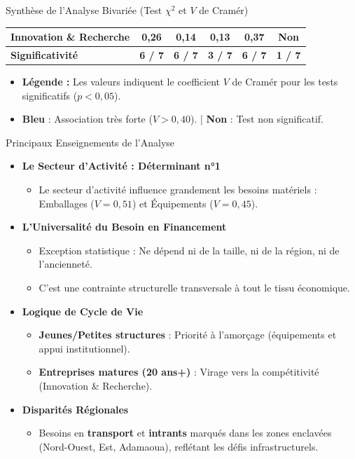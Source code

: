 \documentclass[aspectratio=169, 10pt]{beamer}
\begin{document}
\begin{frame}{Synthèse de l'Analyse Bivariée (Test $\chi^2$ et $V$ de Cramér)}
\begin{center}
\begin{tabular}{l|ccccc}
			Innovation \& Recherche & \cellcolor{green!15}0,26 & \cellcolor{green!15}0,14 & \cellcolor{green!10}0,13 & \cellcolor{green!15}0,37 & Non \\
			\midrule
			\textbf{Significativité} & \textbf{6 / 7} & \textbf{6 / 7} & \textbf{3 / 7} & \textbf{6 / 7} & \textbf{1 / 7} \\
			\bottomrule
		\end{tabular}
	\end{center}
	\vfill
	\begin{itemize}
		\item \tiny \textbf{Légende :} Les valeurs indiquent le coefficient $V$ de Cramér pour les tests significatifs ($p < 0,05$). 
		\item \tiny \color{blue!80}\textbf{Bleu} : Association très forte ($V > 0,40$). \color{black} | \color{gray}\textbf{Non} : Test non significatif.
	\end{itemize}
\end{frame}

\begin{frame}{Principaux Enseignements de l'Analyse}
	\begin{itemize}
		\item \textbf{Le Secteur d'Activité : Déterminant n°1}
		\begin{itemize}
			\item Le secteur d'activité influence grandement les besoins matériels : Emballages ($V=0,51$) et Équipements ($V=0,45$).
		\end{itemize}
		\vfill
		\item \textbf{L'Universalité du Besoin en Financement}
		\begin{itemize}
			\item \alert{Exception statistique} : Ne dépend ni de la taille, ni de la région, ni de l'ancienneté. 
			\item C'est une contrainte structurelle transversale à tout le tissu économique.
		\end{itemize}
		\vfill
		\item \textbf{Logique de Cycle de Vie}
		\begin{itemize}
			\item \textbf{Jeunes/Petites structures} : Priorité à l'amorçage (équipements et appui institutionnel).
			\item \textbf{Entreprises matures (20 ans+)} : Virage vers la compétitivité (Innovation \& Recherche).
		\end{itemize}
		\vfill
		\item \textbf{Disparités Régionales}
		\begin{itemize}
			\item Besoins en \textbf{transport} et \textbf{intrants} marqués dans les zones enclavées (Nord-Ouest, Est, Adamaoua), reflétant les défis infrastructurels.
		\end{itemize}
	\end{itemize}
\end{frame}
\end{document}

